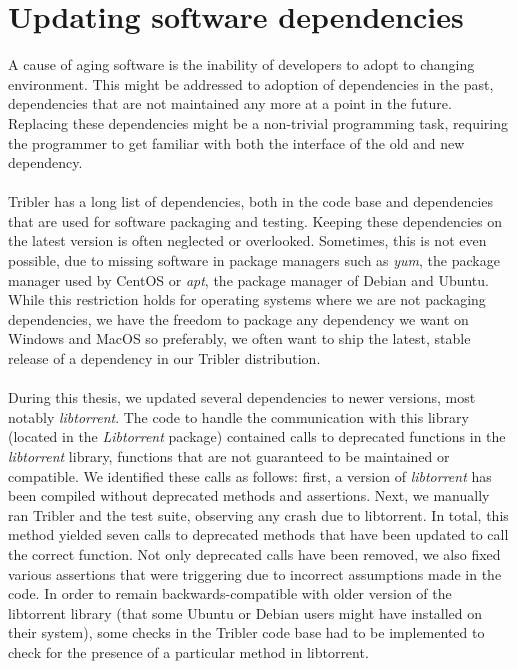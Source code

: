 \section{Updating software dependencies}
A cause of aging software is the inability of developers to adopt to changing environment. This might be addressed to adoption of dependencies in the past, dependencies that are not maintained any more at a point in the future. Replacing these dependencies might be a non-trivial programming task, requiring the programmer to get familiar with both the interface of the old and new dependency.\\\\
Tribler has a long list of dependencies, both in the code base and dependencies that are used for software packaging and testing. Keeping these dependencies on the latest version is often neglected or overlooked. Sometimes, this is not even possible, due to missing software in package managers such as \emph{yum}, the package manager used by CentOS or \emph{apt}, the package manager of Debian and Ubuntu. While this restriction holds for operating systems where we are not packaging dependencies, we have the freedom to package any dependency we want on Windows and MacOS so preferably, we often want to ship the latest, stable release of a dependency in our Tribler distribution.\\\\
During this thesis, we updated several dependencies to newer versions, most notably \emph{libtorrent}. The code to handle the communication with this library (located in the \emph{Libtorrent} package) contained calls to deprecated functions in the \emph{libtorrent} library, functions that are not guaranteed to be maintained or compatible. We identified these calls as follows: first, a version of \emph{libtorrent} has been compiled without deprecated methods and assertions. Next, we manually ran Tribler and the test suite, observing any crash due to libtorrent. In total, this method yielded seven calls to deprecated methods that have been updated to call the correct function. Not only deprecated calls have been removed, we also fixed various assertions that were triggering due to incorrect assumptions made in the code. In order to remain backwards-compatible with older version of the libtorrent library (that some Ubuntu or Debian users might have installed on their system), some checks in the Tribler code base had to be implemented to check for the presence of a particular method in libtorrent.\\\\
